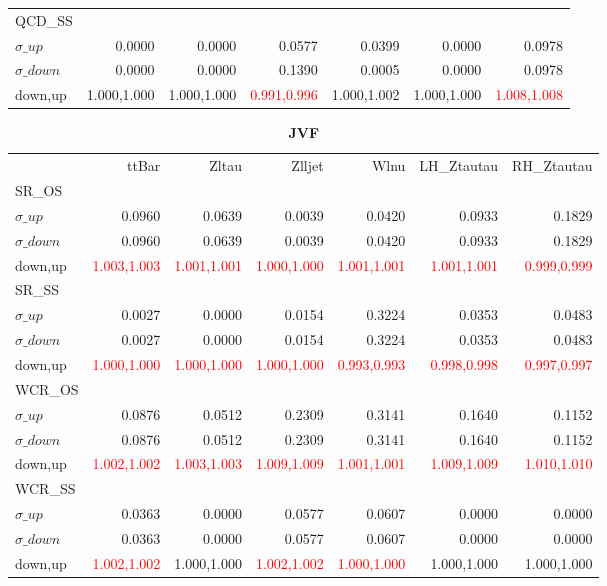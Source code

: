 \documentclass[11pt,oneside,a4paper]{article}
\begin{document}
\begin{table}
\begin{tabular}{lrrrrrr}
\hline
QCD\_SS &  &  &  &  &  &  \\
$\sigma\_up$ & 0.0000 & 0.0000 & 0.0577 & 0.0399 & 0.0000 & 0.0978 \\
$\sigma\_down$ & 0.0000 & 0.0000 & 0.1390 & 0.0005 & 0.0000 & 0.0978 \\
down,up & 1.000,1.000 & 1.000,1.000 & \textcolor{red}{0.991,0.996} & 1.000,1.002 & 1.000,1.000 & \textcolor{red}{1.008,1.008} \\

\hline
\end{tabular}
\end{table}
\begin{table}
\centering
\caption{\bf{JVF}}
\begin{tabular}{lrrrrrr}
 & ttBar & Zltau & Zlljet & Wlnu & LH\_Ztautau & RH\_Ztautau \\
SR\_OS &  &  &  &  &  &  \\
$\sigma\_up$ & 0.0960 & 0.0639 & 0.0039 & 0.0420 & 0.0933 & 0.1829 \\
$\sigma\_down$ & 0.0960 & 0.0639 & 0.0039 & 0.0420 & 0.0933 & 0.1829 \\
down,up & \textcolor{red}{1.003,1.003} & \textcolor{red}{1.001,1.001} & \textcolor{red}{1.000,1.000} & \textcolor{red}{1.001,1.001} & \textcolor{red}{1.001,1.001} & \textcolor{red}{0.999,0.999} \\

\hline
SR\_SS &  &  &  &  &  &  \\
$\sigma\_up$ & 0.0027 & 0.0000 & 0.0154 & 0.3224 & 0.0353 & 0.0483 \\
$\sigma\_down$ & 0.0027 & 0.0000 & 0.0154 & 0.3224 & 0.0353 & 0.0483 \\
down,up & \textcolor{red}{1.000,1.000} & \textcolor{red}{1.000,1.000} & \textcolor{red}{1.000,1.000} & \textcolor{red}{0.993,0.993} & \textcolor{red}{0.998,0.998} & \textcolor{red}{0.997,0.997} \\

\hline
WCR\_OS &  &  &  &  &  &  \\
$\sigma\_up$ & 0.0876 & 0.0512 & 0.2309 & 0.3141 & 0.1640 & 0.1152 \\
$\sigma\_down$ & 0.0876 & 0.0512 & 0.2309 & 0.3141 & 0.1640 & 0.1152 \\
down,up & \textcolor{red}{1.002,1.002} & \textcolor{red}{1.003,1.003} & \textcolor{red}{1.009,1.009} & \textcolor{red}{1.001,1.001} & \textcolor{red}{1.009,1.009} & \textcolor{red}{1.010,1.010} \\

\hline
WCR\_SS &  &  &  &  &  &  \\
$\sigma\_up$ & 0.0363 & 0.0000 & 0.0577 & 0.0607 & 0.0000 & 0.0000 \\
$\sigma\_down$ & 0.0363 & 0.0000 & 0.0577 & 0.0607 & 0.0000 & 0.0000 \\
down,up & \textcolor{red}{1.002,1.002} & 1.000,1.000 & \textcolor{red}{1.002,1.002} & \textcolor{red}{1.000,1.000} & 1.000,1.000 & 1.000,1.000 \\


\end{tabular}
\end{table}
\end{document}
